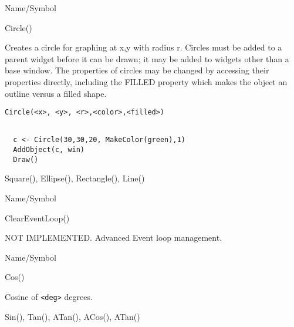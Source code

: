 \begin{desc}{Name/Symbol}
\item[Name/Symbol]	Circle()

\item[Description]	Creates a circle for graphing at x,y with radius
  r. Circles  must be added to a parent widget before it can be drawn; it may be added to
  widgets other than a base window. The properties of circles may be
  changed by accessing their properties directly, including the FILLED
  property which makes the object an outline versus a filled shape.


\item[Usage]
\begin{verbatim}
Circle(<x>, <y>, <r>,<color>,<filled>)
\end{verbatim}

\item[Example]	
\begin{verbatim}
  
  c <- Circle(30,30,20, MakeColor(green),1)
  AddObject(c, win)
  Draw()

\end{verbatim}
\item[See Also]	Square(), Ellipse(), Rectangle(), Line()
\end{desc}

\rl



\begin{desc}{Name/Symbol}
\item[Name/Symbol]  	ClearEventLoop()

\item[Description]  	NOT IMPLEMENTED. Advanced Event loop management.

\item[Usage]		

\item[Example]	

\item[See Also]	
\end{desc}

\rl


\begin{desc}{Name/Symbol}
\item[Name/Symbol]  	Cos()
			 
\item[Description] 	Cosine of \verb+<deg>+ degrees.

\item[Usage]		

\item[Example]	

\item[See Also]     	Sin(), Tan(), ATan(), ACos(), ATan() 
\end{desc}

